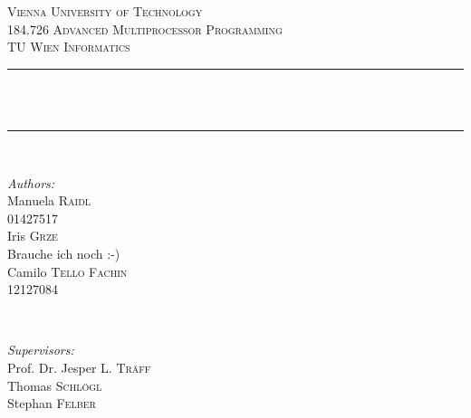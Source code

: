 \begin{titlepage}

\newcommand{\HRule}{\rule{\linewidth}{0.5mm}} %

\center %
 

\textsc{\LARGE Vienna University of Technology}\\[1.5cm] %
\textsc{\Large 184.726 Advanced Multiprocessor Programming}\\[0.5cm] %
\textsc{\large TU Wien Informatics}\\[0.5cm] %


\HRule \\[0.5cm]
{ \huge \bfseries \doctitle}\\[1mm] %
\HRule \\[0.5cm]
 
\hfill

\begin{minipage}{0.58\textwidth}
\begin{flushleft} \large
\emph{Authors:}\\
\null
Manuela \textsc{Raidl}\\
01427517 \\
\null
Iris \textsc{Grze}\\
Brauche ich noch :-) \\
\null
Camilo \textsc{Tello Fachin}\\
12127084 \\

\end{flushleft}
\end{minipage}
~
\begin{minipage}{0.4\textwidth}
\begin{flushleft} \large
\emph{Supervisors:} \\
\null
Prof. Dr. Jesper L. \textsc{Träff} \\ %
\null
Thomas \textsc{Schlögl} \\ %
\null
Stephan \textsc{Felber} \\ %
\null
\end{flushleft}
\end{minipage}\\[1.5cm]
\hfill


\end{titlepage}
